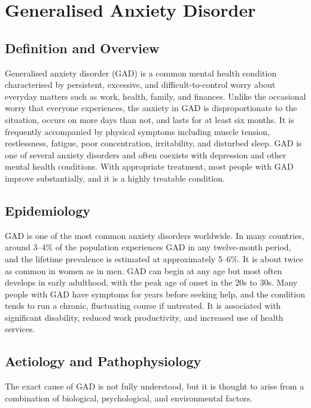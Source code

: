 \chapter{Generalised Anxiety Disorder}

\section*{Definition and Overview}
Generalised anxiety disorder (GAD) is a common mental health condition characterised by persistent, excessive, and difficult-to-control worry about everyday matters such as work, health, family, and finances. Unlike the occasional worry that everyone experiences, the anxiety in GAD is disproportionate to the situation, occurs on more days than not, and lasts for at least six months. It is frequently accompanied by physical symptoms including muscle tension, restlessness, fatigue, poor concentration, irritability, and disturbed sleep. GAD is one of several anxiety disorders and often coexists with depression and other mental health conditions. With appropriate treatment, most people with GAD improve substantially, and it is a highly treatable condition.

\section*{Epidemiology}
GAD is one of the most common anxiety disorders worldwide. In many countries, around 3--4\% of the population experiences GAD in any twelve-month period, and the lifetime prevalence is estimated at approximately 5--6\%. It is about twice as common in women as in men. GAD can begin at any age but most often develops in early adulthood, with the peak age of onset in the 20s to 30s. Many people with GAD have symptoms for years before seeking help, and the condition tends to run a chronic, fluctuating course if untreated. It is associated with significant disability, reduced work productivity, and increased use of health services.

\section*{Aetiology and Pathophysiology}
The exact cause of GAD is not fully understood, but it is thought to arise from a combination of biological, psychological, and environmental factors.

